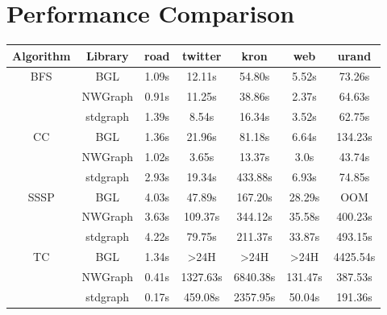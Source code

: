 \section{Performance Comparison} \label{performance}
\centering
\begin{tabular}{ c c c c c c c }
Algorithm & Library & road & twitter & kron & web & urand \\
\hline
\multirow{3}{*}{BFS} & BGL & 1.09s & 12.11s & 54.80s & 5.52s & 73.26s \\
& NWGraph & 0.91s & 11.25s & 38.86s & 2.37s & 64.63s \\
& stdgraph & 1.39s & 8.54s & 16.34s & 3.52s & 62.75s \\
\hline
\multirow{3}{*}{CC} & BGL & 1.36s & 21.96s & 81.18s & 6.64s & 134.23s \\
& NWGraph & 1.02s & 3.65s & 13.37s & 3.0s & 43.74s \\
& stdgraph & 2.93s & 19.34s & 433.88s & 6.93s & 74.85s \\
\hline
\multirow{3}{*}{SSSP} & BGL & 4.03s & 47.89s & 167.20s & 28.29s & OOM \\
& NWGraph & 3.63s & 109.37s & 344.12s & 35.58s & 400.23s \\
& stdgraph & 4.22s & 79.75s & 211.37s & 33.87s & 493.15s \\
\hline
\multirow{3}{*}{TC} & BGL & 1.34s & >24H & >24H & >24H & 4425.54s \\
& NWGraph & 0.41s & 1327.63s & 6840.38s & 131.47s & 387.53s \\
& stdgraph & 0.17s & 459.08s & 2357.95s & 50.04s & 191.36s \\
\hline
\end{tabular}
